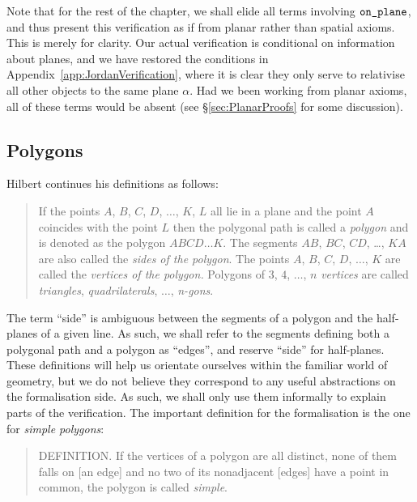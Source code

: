 Note that for the rest of the chapter, we shall elide all terms involving $\texttt{on\_plane}$, and thus present this verification as if from planar rather than spatial axioms. This is merely for clarity. Our actual verification is conditional on information about planes, and we have restored the conditions in Appendix~\ref{app:JordanVerification}, where it is clear they only serve to relativise all other objects to the same plane $\alpha$. Had we been working from planar axioms, all of these terms would be absent (see \S\ref{sec:PlanarProofs} for some discussion).

\subsection{Polygons}\label{sec:polygonFormalisation}
Hilbert continues his definitions as follows:
\begin{quote}
  If the points $A$, $B$, $C$, $D$, $\ldots$, $K$, $L$ all lie in a plane and the point $A$ coincides with the point $L$ then the polygonal path is called a \emph{polygon} and is denoted as the polygon $ABCD\ldots K$. The segments $AB$, $BC$, $CD$, \ldots, $KA$ are also called the \emph{sides of the polygon}. The points $A$, $B$, $C$, $D$, $\ldots$, $K$ are called the \emph{vertices of the polygon.} Polygons of $3$, $4$, $\ldots$, $n$ \emph{vertices} are called \emph{triangles}, \emph{quadrilaterals}, $\ldots$, \emph{n-gons}.
\end{quote}

The term ``side'' is ambiguous between the segments of a polygon and the half-planes of a given line. As such, we shall refer to the segments defining both a polygonal path and a polygon as ``edges'', and reserve ``side'' for half-planes. These definitions will help us orientate ourselves within the familiar world of geometry, but we do not believe they correspond to any useful abstractions on the formalisation side. As such, we shall only use them informally to explain parts of the verification. The important definition for the formalisation is the one for \emph{simple polygons}:
\begin{quote}
  DEFINITION. If the vertices of a polygon are all distinct, none of them falls on [an edge] and no two of its nonadjacent [edges] have a point in common, the polygon is called \emph{simple}.
\end{quote}

